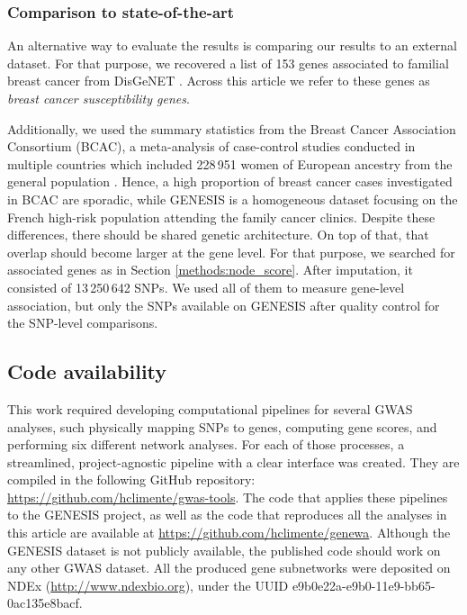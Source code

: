 \documentclass[twocolumn, 11pt, draft]{article}
\begin{document}
\subsubsection{Comparison to state-of-the-art}
\label{methods:bcac}
An alternative way to evaluate the results is comparing our results to an external dataset. For that purpose, we recovered a list of 153 genes associated to familial breast cancer from DisGeNET \cite{pinero_disgenet:_2017}. Across this article we refer to these genes as \emph{breast cancer susceptibility genes}.

Additionally, we used the summary statistics from the Breast Cancer Association Consortium (BCAC), a meta-analysis of case-control studies conducted in multiple countries which included 228\,951 women of European ancestry from the general population \cite{Michailidou2017}. Hence, a high proportion of breast cancer cases investigated in BCAC are sporadic, while GENESIS is a homogeneous dataset focusing on the French high-risk population attending the family cancer clinics. Despite these differences, there should be shared genetic architecture. On top of that, that overlap should become larger at the gene level. For that purpose, we searched for associated genes as in Section \ref{methods:node_score}. After imputation, it consisted of 13\,250\,642 SNPs. We used all of them to measure gene-level association, but only the SNPs available on GENESIS after quality control for the SNP-level comparisons.

\subsection{Code availability}

This work required developing computational pipelines for several GWAS analyses, such physically mapping SNPs to genes, computing gene scores, and performing six different network analyses. For each of those processes, a streamlined, project-agnostic pipeline with a clear interface was created. They are compiled in the following GitHub repository: \url{https://github.com/hclimente/gwas-tools}. The code that applies these pipelines to the GENESIS project, as well as the code that reproduces all the analyses in this article are available at \url{https://github.com/hclimente/genewa}. Although the GENESIS dataset is not publicly available, the published code should work on any other GWAS dataset. All the produced gene subnetworks were deposited on NDEx (\url{http://www.ndexbio.org}), under the UUID e9b0e22a-e9b0-11e9-bb65-0ac135e8bacf.
\end{document}
